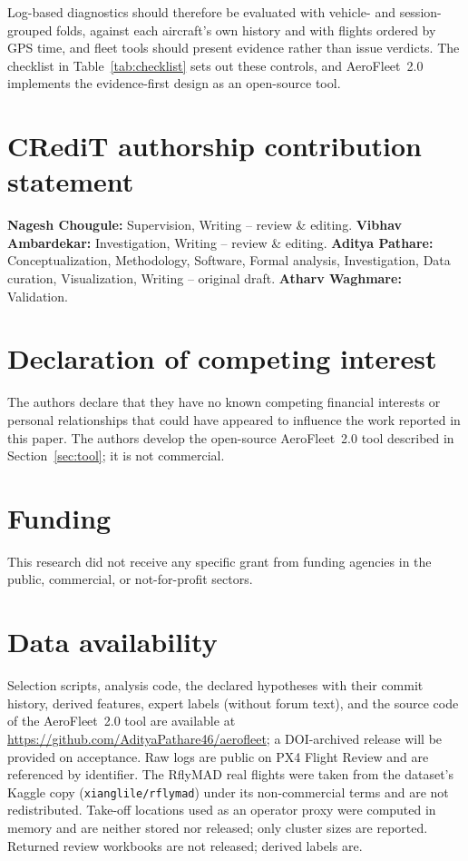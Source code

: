 \documentclass[preprint,12pt]{elsarticle}
\begin{document}
Log-based diagnostics should therefore be evaluated with vehicle- and session-grouped folds, against each aircraft's own history and with flights ordered by GPS time, and fleet tools should present evidence rather than issue verdicts. The checklist in Table~\ref{tab:checklist} sets out these controls, and AeroFleet~2.0 implements the evidence-first design as an open-source tool.

\section*{CRediT authorship contribution statement}
\textbf{Nagesh Chougule:} Supervision, Writing -- review \& editing.
\textbf{Vibhav Ambardekar:} Investigation, Writing -- review \& editing.
\textbf{Aditya Pathare:} Conceptualization, Methodology, Software, Formal analysis, Investigation, Data curation,
Visualization, Writing -- original draft.
\textbf{Atharv Waghmare:} Validation.

\section*{Declaration of competing interest}
The authors declare that they have no known competing financial interests or personal relationships that could have appeared to influence the work reported in this paper. The authors develop the open-source AeroFleet~2.0 tool described in Section~\ref{sec:tool}; it is not commercial.

\section*{Funding}
This research did not receive any specific grant from funding agencies in the public, commercial, or not-for-profit
sectors.

\section*{Data availability}
{\sloppy
Selection scripts, analysis code, the declared hypotheses with their commit history, derived features, expert labels
(without forum text), and the source code of the AeroFleet~2.0 tool are available at
\url{https://github.com/AdityaPathare46/aerofleet}; a DOI-archived release will be provided on acceptance. Raw logs
are public on PX4 Flight Review and are referenced by identifier. The RflyMAD real flights were taken from the dataset's Kaggle copy (\texttt{xianglile/rflymad}) under its non-commercial terms and are not redistributed. Take-off locations used as an operator proxy were computed in memory and are neither stored nor released; only cluster sizes are reported. Returned review workbooks are not released; derived labels are.\par}
\end{document}
